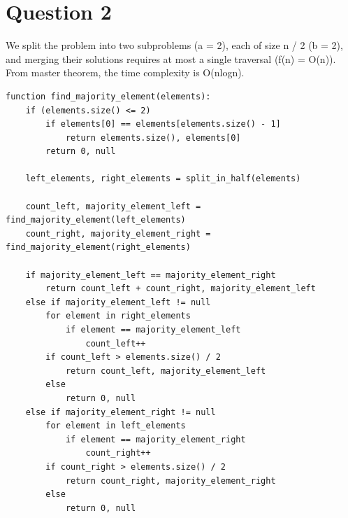 \documentclass[11pt, oneside]{article}
\begin{document}
\section{Question 2}
We split the problem into two subproblems (a = 2), each of size n / 2 (b = 2), and merging their solutions requires at most a single traversal (f(n) = O(n)). From master theorem, the time complexity is O(nlogn).

\begin{lstlisting}
function find_majority_element(elements):
    if (elements.size() <= 2)
        if elements[0] == elements[elements.size() - 1]
            return elements.size(), elements[0]
        return 0, null

    left_elements, right_elements = split_in_half(elements)

    count_left, majority_element_left = find_majority_element(left_elements)
    count_right, majority_element_right = find_majority_element(right_elements)

    if majority_element_left == majority_element_right
        return count_left + count_right, majority_element_left
    else if majority_element_left != null
        for element in right_elements
            if element == majority_element_left
                count_left++
        if count_left > elements.size() / 2
            return count_left, majority_element_left
        else
            return 0, null
    else if majority_element_right != null
        for element in left_elements
            if element == majority_element_right
                count_right++
        if count_right > elements.size() / 2
            return count_right, majority_element_right
        else
            return 0, null
\end{lstlisting}

\clearpage

\end{document}
